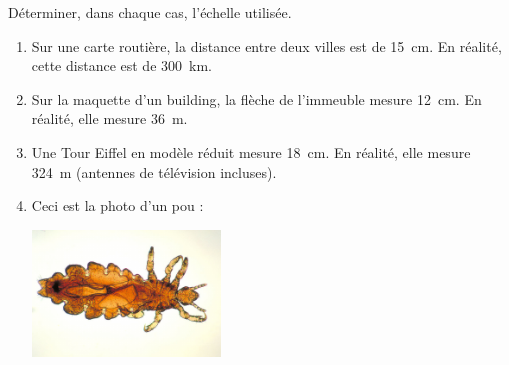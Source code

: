 
\begin{exercice}\label{exo2smath-0126}

Déterminer, dans chaque cas, l'échelle utilisée.
\begin{enumerate}
    \item
 Sur une carte routière, la distance entre deux villes est de \SI{15}{\centi\meter}. En réalité, cette distance est de \SI{300}{\kilo\meter}.
\item
    Sur la maquette d’un building, la flèche de l'immeuble mesure \SI{12}{\centi\meter}. En réalité, elle mesure \SI{36}{\meter}.
\item
    Une Tour Eiffel en modèle réduit mesure \SI{18}{\centi\meter}. En réalité, elle mesure \SI{324}{\meter} (antennes de télévision incluses).
\item
    Ceci est la photo d'un pou\cite{OUDMooPWBllL} :
    \begin{center}
 \includegraphics[width=5cm]{Pediculus_humanus.pdf}
    \end{center}

\end{enumerate}

\end{exercice}
